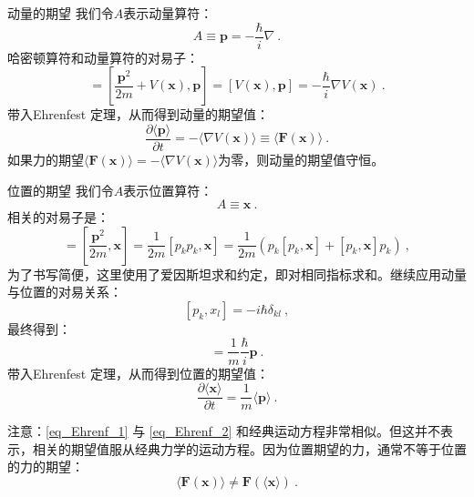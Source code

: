 \begin{example}{动量的期望}
我们令$A$表示动量算符：
\begin{equation}
A \equiv \boldsymbol{p} = -\frac{\hbar}{i} \nabla~.
\end{equation}
哈密顿算符和动量算符的对易子：
\begin{equation}
[H, \boldsymbol{p}]=\left[\frac{\boldsymbol{p}^2}{2 m}+V(\boldsymbol{x}), \boldsymbol{p}\right]=[V(\boldsymbol{x}), \boldsymbol{p}]=-\frac{\hbar}{i} \nabla V(\boldsymbol{x})~.
\end{equation}
带入Ehrenfest 定理，从而得到动量的期望值：
\begin{equation}\label{eq_Ehrenf_1}
\frac{\partial\langle\boldsymbol{p}\rangle}{\partial t}=-\langle\nabla V(\boldsymbol{x})\rangle \equiv\langle\boldsymbol{F}(\boldsymbol{x})\rangle~.
\end{equation}
如果力的期望$\langle\boldsymbol{F}(\boldsymbol{x})\rangle=-\langle\nabla V(\boldsymbol{x})\rangle$为零，则动量的期望值守恒。
\end{example}
\begin{example}{位置的期望}
我们令$A$表示位置算符：
\begin{equation}
A \equiv \boldsymbol{x}~.
\end{equation}
相关的对易子是：
\begin{equation}
[H, \boldsymbol{x}]=\left[\frac{\boldsymbol{p}^2}{2 m}, \boldsymbol{x}\right]=\frac{1}{2 m}\left[p_k p_k, \boldsymbol{x}\right]=\frac{1}{2 m}\left(p_k\left[p_k, \boldsymbol{x}\right]+\left[p_k, \boldsymbol{x}\right] p_k\right)~,
\end{equation}
为了书写简便，这里使用了爱因斯坦求和约定，即对相同指标求和。继续应用动量与位置的对易关系：
\begin{equation}
\left[p_k, x_l\right]=-i \hbar \delta_{k l}~,
\end{equation}
最终得到：
\begin{equation}
[H, \boldsymbol{x}]=\frac{1}{m} \frac{\hbar}{i} \boldsymbol{p}~.
\end{equation}
带入Ehrenfest 定理，从而得到位置的期望值：
\begin{equation}\label{eq_Ehrenf_2}
\frac{\partial\langle\boldsymbol{x}\rangle}{\partial t}=\frac{1}{m}\langle\boldsymbol{p}\rangle ~.
\end{equation}
\end{example}

注意：\autoref{eq_Ehrenf_1} 与 \autoref{eq_Ehrenf_2} 和经典运动方程非常相似。但这并不表示，相关的期望值服从经典力学的运动方程。因为位置期望的力，通常不等于位置的力的期望：
\begin{equation}
\langle\boldsymbol{F}(\boldsymbol{x})\rangle \ne \boldsymbol{F}(\langle\boldsymbol{x}\rangle)~.
\end{equation}